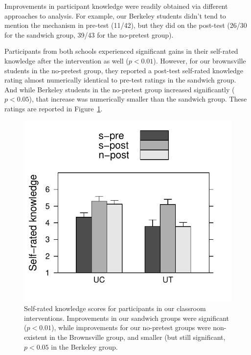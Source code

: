 
Improvements in participant knowledge were readily obtained via different
approaches to analysis. For example, our Berkeley students didn't tend to
mention the mechanism in pre-test (11/42), but they did on the post-test (26/30
for the sandwich group, 39/43 for the no-pretest group).

Participants from both schools experienced significant gains in their self-rated
knowledge after the intervention as well ($p < 0.01$). However, for our
brownsville students in the no-pretest group, they reported a post-test
self-rated knowledge rating almost numerically identical to pre-test ratings in
the sandwich group. And while Berkeley students in the no-pretest group
increased significantly ($p < 0.05$), that increase was numerically smaller than the
sandwich group. These ratings are reported in
Figure~\ref{fig:class-self-rated}.

\begin{figure}
    \centering
    \includegraphics{class-self-rated.pdf}
    \caption{Self-rated knowledge scores for participants in our classroom
        interventions. Improvements in our sandwich groups were significant ($p
        < 0.01$), while improvements for our no-pretest groups were non-existent
        in the Brownsville group, and smaller (but still significant, $p < 0.05$
        in the Berkeley group.}
    \label{fig:class-self-rated}
\end{figure}

